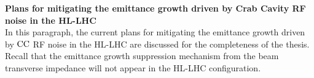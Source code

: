 



\textbf{Plans for mitigating the emittance growth driven by Crab Cavity RF noise in the HL-LHC}\\
In this paragraph, the current plans for mitigating the emittance growth driven by ${\mathrm{CC}}$ RF noise in the HL-LHC are discussed for the completeness of the thesis. Recall that the emittance growth suppression mechanism from the beam transverse impedance will not appear in the HL-LHC configuration.




